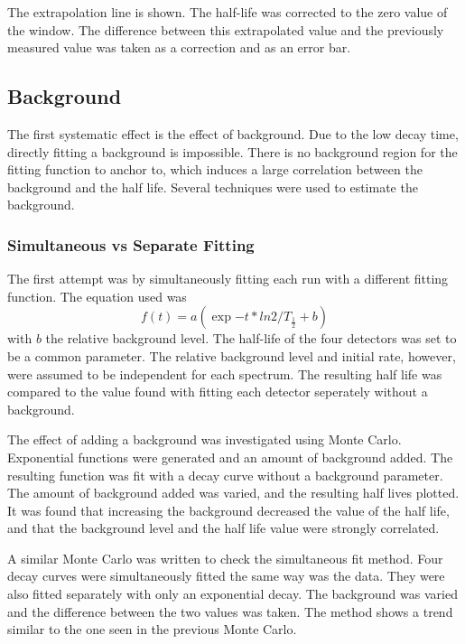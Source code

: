 \documentclass[MaxHughesThesis.tex]{subfiles}
\begin{document}
The extrapolation line is shown.
The half-life was corrected to the zero value of the window.
The difference between this extrapolated value and the previously measured value was taken as a correction and as an error bar.
 
\subsection{Background}

The first systematic effect is the effect of background.
Due to the low decay time, directly fitting a background is impossible.
There is no background region for the fitting function to anchor to, which induces a large correlation between the background and the half life.
Several techniques were used to estimate the background.

\subsubsection{Simultaneous vs Separate Fitting}
The first attempt was by simultaneously fitting each run with a different fitting function.
The equation used was 
%
\begin{equation}
	f(t) = a(\exp{-t*ln2/T_{\frac{1}{2}}} + b)
	\label{eq:fit-bg}
\end{equation}
%
with $b$ the relative background level.
The half-life of the four detectors was set to be a common parameter. 
The relative background level and initial rate, however, were assumed to be independent for each spectrum.
The resulting half life was compared to the value found with fitting each detector seperately without a background.

The effect of adding a background was investigated using Monte Carlo.
Exponential functions were generated and an amount of background added.
The resulting function was fit with a decay curve without a background parameter.
The amount of background added was varied, and the resulting half lives plotted.
It was found that increasing the background decreased the value of the half life, and that the background level and the half life value were strongly correlated.

A similar Monte Carlo was written to check the simultaneous fit method.
Four decay curves were simultaneously fitted the same way was the data.
They were also fitted separately with only an exponential decay.
The background was varied and the difference between the two values was taken.
The method shows a trend similar to the one seen in the previous Monte Carlo.
\end{document}
